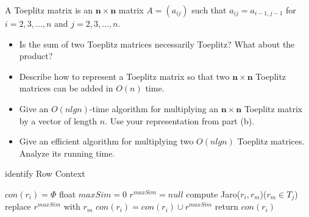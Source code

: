 \newpage
{} %

\problemdes

A Toeplitz matrix is an $\boldsymbol{n} \times \boldsymbol{n}$ matrix $A=\left(a_{i j}\right)$ such that $a_{i j}=a_{i-1, j-1}$ for $i = 2,3,...,n$ and $j = 2,3,...,n$.

\begin{itemize}
\item Is the sum of two Toeplitz matrices necessarily Toeplitz? What about the product?
\item Describe how to represent a Toeplitz matrix so that two $\boldsymbol{n} \times \boldsymbol{n}$ Toeplitz matrices can be added in $O(n)$ time.
\item Give an $O(n lg n)$-time algorithm for multiplying an $\boldsymbol{n} \times \boldsymbol{n}$ Toeplitz matrix by a vector of length $n$. Use your representation from part (b).
\item Give an efficient algorithm for multiplying two $O(n lg n)$ Toeplitz matrices. Analyze its running time.
\end{itemize}

\solution



\begin{algorithm}
  \caption{identify Row Context}
  $con(r_i)= \Phi$\;
  {
    float $maxSim=0$\;
    $r^{maxSim}=null$\;
    {
      compute Jaro($r_i,r_m$)($r_m\in T_j$)\;
      {
        replace $r^{maxSim}$ with $r_m$\;
      }
    }
    $con(r_i)=con(r_i)\cup {r^{maxSim}}$\;
  }
  return $con(r_i)$\;
\end{algorithm}


